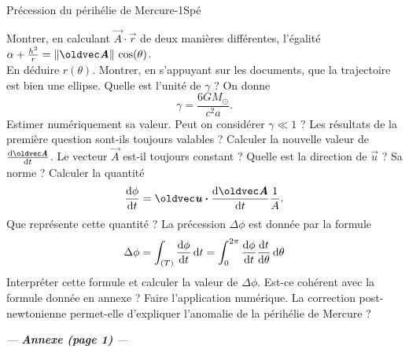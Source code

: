 \begin{exercise}{Précession du périhélie de Mercure}{-1}{Spé}
\begin{questions}
    \question Montrer, en calculant $\vec{A}\cdot\vec{r}$ de deux manières différentes, l'égalité $\alpha + \frac{h^2}{r} = \norm*{\vec{A}}\cos(\theta)$.\\ En déduire $r(\theta)$. Montrer, en s'appuyant sur les documents, que la trajectoire est bien une ellipse.
    \question Quelle est l'unité de $\gamma$ ? On donne $$\gamma = \frac{6 G M_\odot}{c^2a}.$$
    Estimer numériquement sa valeur. Peut on considérer $\gamma \ll 1$ ?
    \question Les résultats de la première question sont-ils toujours valables ?
    \question Calculer la nouvelle valeur de $\dv{\vec{A}}{t}$. Le vecteur $\vec{A}$ est-il toujours constant ?
    \question Quelle est la direction de $\vec{u}$ ? Sa norme ?
    \question Calculer la quantité $$\dv{\phi}{t}(\theta) = \vec{u}\vdot \dv{\vec{A}}{t}\frac{1}{A}.$$
    Que représente cette quantité ?
    \question La précession $\Delta \phi$ est donnée par la formule 
    $$\Delta \phi = \int_{(T)} \dv{\phi}{t}\dd{t} = \int_0^{2\pi}\dv{\phi}{t}\dv{t}{\theta}\dd{\theta}$$
    Interpréter cette formule et calculer la valeur de $\Delta \phi$. Est-ce cohérent avec la formule donnée en annexe ?
    \question Faire l'application numérique. La correction post-newtonienne permet-elle d'expliquer l'anomalie de la périhélie de Mercure ?
\end{questions}

\end{exercise}
\pagebreak

\printexerciseheader

\begin{center}
    \itshape --- \quad \textbf{Annexe (page 1)} \quad ---
\end{center}

